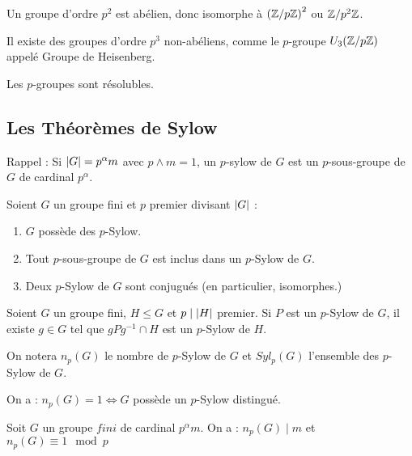 \documentclass{cours}
\begin{document}
\begin{corollary}
    Un groupe d'ordre $p^{2}$ est abélien, donc isomorphe à $\left(\mathbb{Z}/p\mathbb{Z}\right)^{2}$ ou $\mathbb{Z}/p^{2}\mathbb{Z}$.
\end{corollary}

\begin{remark}
    Il existe des groupes d'ordre $p^{3}$ non-abéliens, comme le $p$-groupe $U_{3}(\mathbb{Z}/p\mathbb{Z})$ appelé Groupe de Heisenberg.
\end{remark}

\begin{corollary}
    Les $p$-groupes sont résolubles.
\end{corollary}

\subsection{Les Théorèmes de Sylow}
Rappel : Si $\left|G\right| = p^{\alpha}m$ avec $p \wedge m = 1$, un $p$-sylow de $G$ est un $p$-sous-groupe de $G$ de cardinal $p^{\alpha}$.

\begin{theorem}[Sylw]
    Soient $G$ un groupe fini et $p$ premier divisant $\left|G\right|$ :
    \begin{enumerate}
        \item $G$ possède des $p$-Sylow.
        \item Tout $p$-sous-groupe de $G$ est inclus dans un $p$-Sylow de $G$.
        \item Deux $p$-Sylow de $G$ sont conjugués (en particulier, isomorphes.)
    \end{enumerate}
\end{theorem}

\begin{lemma}
    Soient $G$ un groupe fini, $H \leq G$ et $p \mid \left|H\right|$ premier. Si $P$ est un $p$-Sylow de $G$, il existe $g \in G$ tel que $gPg^{-1} \cap H$ est un $p$-Sylow de $H$.
\end{lemma}

\begin{definition}
    On notera $n_{p}(G)$ le nombre de $p$-Sylow de $G$ et $Syl_{p}(G)$ l'ensemble des $p$-Sylow de $G$.
\end{definition}
\begin{corollary}
    On a : $n_{p}(G) = 1 \Leftrightarrow G$ possède un $p$-Sylow distingué.
\end{corollary}

\begin{theorem}
    Soit $G$ un groupe $fini$ de cardinal $p^{\alpha}m$. On a : $n_{p}(G) \mid m$ et $ n_{p}(G) \equiv 1 \mod p$
\end{theorem}
\end{document}
